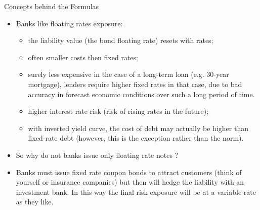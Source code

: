 \documentclass{beamer}
\begin{document}
\begin{frame}{Concepts behind the Formulas}
	\begin{itemize}
		\item<0->Banks like floating rates exposure: 
		\begin{itemize}
			\item<1-> [\goodcheck] the liability value (the bond floating rate) resets with rates;
			\item<1-> [\goodcheck] often smaller costs then fixed rates;
			\item<1-> [\goodcheck]surely less expensive in the case of a long-term loan (e.g. 30-year mortgage), lenders require higher fixed rates in that case, due to bad accuracy in forecast economic conditions over such a long period of time.
			\item<2-> [\badcheck] higher interest rate risk (risk of rising rates in the future);
			\item<2-> [\badcheck] with inverted yield curve, the cost of debt may actually be higher than fixed-rate debt (however, this is the exception rather than the norm).
		\end{itemize}
		\item<3-> So why do not banks issue only floating rate notes ?
		\item<4-> Banks must issue fixed rate coupon bonds to attract customers (think of yourself or insurance companies) but then will hedge the liability  with an investment bank. In this way the final risk exposure will be at a variable rate as they like. 
	\end{itemize}
\end{frame}

\end{document}

